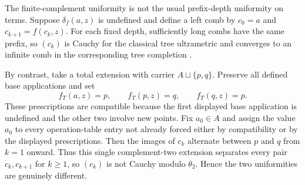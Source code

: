 \begin{remark}
\label{rem:prefix-depth-contrast}
The finite-complement uniformity is not the usual prefix-depth uniformity on
terms.  Suppose $\delta_f(a,z)$ is undefined and define a left comb by
$c_0=a$ and $c_{k+1}=f(c_k,z)$.  For each fixed depth, sufficiently long combs
have the same prefix, so $(c_k)$ is Cauchy for the classical tree ultrametric
and converges to an infinite comb in the corresponding tree completion
\cite{ArnoldNivat1980,Courcelle1983}.

By contrast, take a total extension with carrier $A\sqcup\{p,q\}$.  Preserve
all defined base applications and set
\[
 f_T(a,z)=p,\qquad f_T(p,z)=q,\qquad f_T(q,z)=p.
\]
These prescriptions are compatible because the first displayed base
application is undefined and the other two involve new points.  Fix
$a_0\in A$ and assign the value $a_0$ to every operation-table entry not
already forced either by compatibility or by the displayed prescriptions.
Then the images of $c_k$ alternate between $p$ and $q$ from $k=1$ onward.
Thus this single complement-two extension separates every pair
$c_k,c_{k+1}$ for $k\ge1$, so $(c_k)$ is not Cauchy modulo $\theta_2$.  Hence
the two uniformities are genuinely different.
\end{remark}
